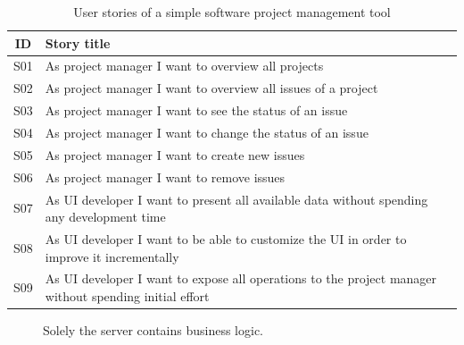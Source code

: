 \begin{table}
  \begin{center}
    \begin{tabular}{ |c|l| }
      \hline
      ID & Story title \\
      \hline
      S01 & As project manager I want to overview all projects \\
      S02 & As project manager I want to overview all issues of a project \\
      S03 & As project manager I want to see the status of an issue \\
      S04 & As project manager I want to change the status of an issue \\
      S05 & As project manager I want to create new issues \\
      S06 & As project manager I want to remove issues \\
      S07 & As UI developer I want to present all available data without spending any development time \\
      S08 & As UI developer I want to be able to customize the UI in order to improve it incrementally \\
      S09 & As UI developer I want to expose all operations to the project manager without spending initial effort \\
      \hline
    \end{tabular}
    \caption{User stories of a simple software project management tool}
  \end{center}
\end{table}

\begin{figure}[!htb]
  \caption{Solely the server contains business logic.}
\end{figure}

